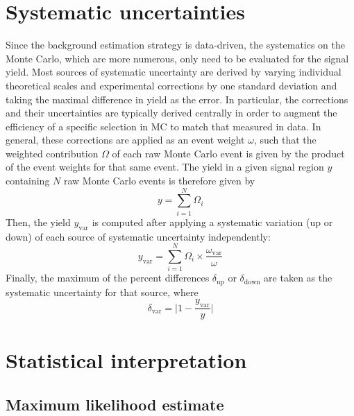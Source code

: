 \section{Systematic uncertainties}
Since the background estimation strategy is data-driven, the systematics on the Monte Carlo, which are more numerous, only need to be evaluated for the signal yield. 
Most sources of systematic uncertainty are derived by varying individual theoretical scales and experimental corrections by one standard deviation and taking the maximal difference in yield as the error. 
In particular, the corrections and their uncertainties are typically derived centrally in order to augment the efficiency of a specific selection in MC to match that measured in data.
In general, these corrections are applied as an event weight $\omega$, such that the weighted contribution $\Omega$ of each raw Monte Carlo event is given by the product of the event weights for that same event. 
The yield in a given signal region $y$ containing $N$ raw Monte Carlo events is therefore given by
\begin{equation}
    y = \sum_{i = 1}^{N}\Omega_i
\end{equation}
Then, the yield $y_\text{var}$ is computed after applying a systematic variation (up or down) of each source of systematic uncertainty independently:
\begin{equation}\label{eq:systs}
    y_\text{var} = \sum_{i = 1}^{N}\Omega_i\times\frac{\omega_\text{var}}{\omega}
\end{equation}
Finally, the maximum of the percent differences $\delta_\text{up}$ or $\delta_\text{down}$ are taken as the systematic uncertainty for that source, where
\begin{equation}
    \delta_\text{var} = \bigg| 1-\frac{y_\text{var}}{y} \bigg|
\end{equation}

\section{Statistical interpretation}
\subsection{Maximum likelihood estimate}

